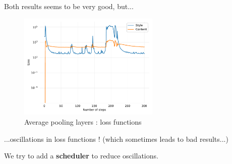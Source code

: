\documentclass[12pt]{beamer}
\begin{document}
\begin{frame}
        Both results seems to be very good, but...
    \end{frame}
    
    \begin{frame}
        \begin{figure}[H]
            \centering
            \includegraphics[width=0.6\textwidth]{resources/gatys/architecture/sun-trees-paris-avgpool.pdf}
            \caption*{Average pooling layers : loss functions}
        \end{figure}
        
        ...oscillations in loss functions ! \scriptsize{(which sometimes leads to bad results...)}
        
        \normalsize{We try to add a \textbf{scheduler} to reduce oscillations.}
    \end{frame}
    
\end{document}
